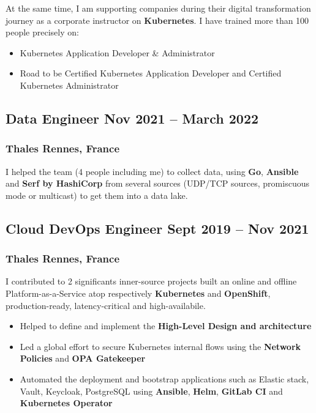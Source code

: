 \documentclass[11pt]{article}
\newcommand{\rside}[1]{
  \hfill {\normalfont\color{gray} #1}%
}
\begin{document}
\begin{justify}
  At the same time, I am supporting companies during their digital transformation journey as a corporate instructor on \textbf{Kubernetes}. I have trained more than 100 people precisely on:
  
  \begin{itemize}
    \item Kubernetes Application Developer \& Administrator
    \item Road to be Certified Kubernetes Application Developer and Certified Kubernetes Administrator
  \end{itemize}
\end{justify}

\subsection{Data Engineer \rside{Nov 2021 -- March 2022}}
\subsubsection{Thales \rside{Rennes, France}}

\begin{justify}
  I helped the team (4 people including me) to collect data, using \textbf{Go}, \textbf{Ansible} and \textbf{Serf by HashiCorp} from several sources (UDP/TCP sources, promiscuous mode or multicast) to get them into a data lake.
\end{justify}
\vspace{-2mm}

\subsection{Cloud DevOps Engineer \rside{Sept 2019 -- Nov 2021}}
\subsubsection{Thales \rside{Rennes, France}}

\begin{justify}
  I contributed to 2 significants inner-source projects built an online and offline Platform-as-a-Service atop respectively \textbf{Kubernetes} and \textbf{OpenShift}, production-ready, latency-critical and high-availabile.
\end{justify}
\vspace{-2mm}

\begin{itemize}
  \item Helped to define and implement the \textbf{High-Level Design and architecture}
  \item Led a global effort to secure Kubernetes internal flows using the \textbf{Network Policies} and \textbf{OPA Gatekeeper}
  \item Automated the deployment and bootstrap applications such as Elastic stack, Vault, Keycloak, PostgreSQL using \textbf{Ansible}, \textbf{Helm}, \textbf{GitLab CI} and \textbf{Kubernetes Operator}
\end{itemize}
\end{document}

